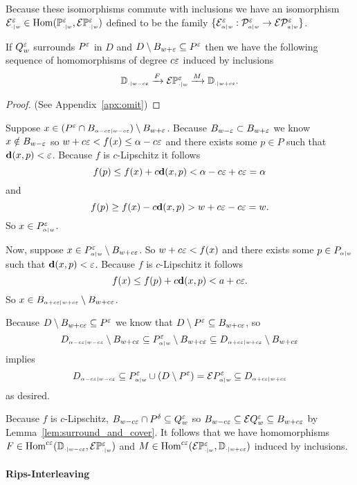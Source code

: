   Because these isomorphisms commute with inclusions we have an isomorphism $\E\subi{w}{\cdot}^\e \in \Hom(\PP{w}{\e},\ext{\PP{w}{\e}})$ defined to be the family $\{\E\subi{w}{\alpha}^\e : \P{w}{\e}{a}\to \E\P{w}{\e}{a}\}$.
\endproofatend

\begin{lemma}\label{lem:p_interleave}
 If $Q_w^\e$ surrounds $P^\e$ in $D$ and $D\setminus B_{w + \e}\subseteq P^\e$ then we have the following sequence of homomorphisms of degree $c\e$ induced by inclusions
 \[\DD{w-c\e}\xrightarrow{F}\E\PP{w}{\e}\xrightarrow{M}\DD{w+c\e}.\]
\end{lemma}
\begin{proof}
  (See Appendix~\ref{apx:omit})
\end{proof}
\proofatend
  Suppose $x\in (P^\e\cap B\subi{w-c\e}{\alpha-c\e})\setminus B_{w+\e}$.
  Because $B_{w-\e}\subset B_{w+\e}$ we know $x\notin B_{w-\e}$ so $w+c\e < f(x)\leq \alpha-c\e$ and there exists some $p\in P$ such that $\dist(x, p) < \e$.
  Because $f$ is $c$-Lipschitz it follows
  \[ f(p)\leq f(x) + c\dist(x, p) < \alpha - c\e + c\e = \alpha\]
  and
  \[ f(p)\geq f(x) - c\dist(x, p) > w+c\e-c\e = w.\]
  So $x\in P\subi{w}{\alpha}^\e$.

  Now, suppose $x\in P\subi{w}{\alpha}^\e\setminus B_{w+c\e}$.
  So $w+c\e < f(x)$ and there exists some $p\in P\subi{w}{\alpha}$ such that $\dist(x,p) < \e$.
  Because $f$ is $c$-Lipschitz it follows
  \[ f(x) \leq f(p) + c\dist(x,p) < a + c\e.\]
  So $x\in B\subi{w+c\e}{\alpha+c\e}\setminus B_{w+c\e}$.

  Because $D\setminus B_{w+c\e}\subseteq P^\e$ we know that $D\setminus P^\e \subseteq B_{w+c\e}$, so
  \[D\subi{w-c\e}{\alpha-c\e}\setminus B_{w+c\e} \subseteq P\subi{w}{\alpha}^\e\setminus B_{w+c\e}\subseteq D\subi{w+c\e}{\alpha+c\e}\setminus B_{w+c\e}\]
  implies
  \[ D\subi{w-c\e}{\alpha-c\e}\subseteq P\subi{w}{\alpha}^\e\cup (D\setminus P^\e) = \ext{P\subi{w}{\alpha}^\e} \subseteq D\subi{w+c\e}{\alpha+c\e} \]
  as desired.

  Because $f$ is $c$-Lipschitz, $B_{w-c\e}\cap P^\delta\subseteq Q_{w}^\e$ so $B_{w-c\e} \subseteq \E Q_w^\e\subseteq B_{w+c\e}$ by Lemma~\ref{lem:surround_and_cover}.
  It follows that we have homomorphisms $F\in \Hom^{c\e}(\DD{w-c\e}, \E\PP{w}{\e})$ and $M\in\Hom^{c\e}(\E\PP{w}{\e}, \DD{w+c\e})$ induced by inclusions.
\endproofatend

\paragraph{Rips-\Cech Interleaving}

